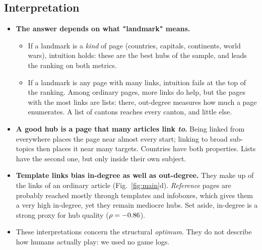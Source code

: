 \documentclass[10pt,a4paper]{article}
\begin{document}
\subsection{Interpretation}
\begin{itemize}
\item \textbf{The answer depends on what "landmark" means.}
  \begin{itemize}
  \item If a landmark is a \emph{kind} of page (countries, capitals, continents, world wars),
    intuition holds: these are the best hubs of the sample, and \BestHub{} leads the ranking on
    both metrics.
  \item If a landmark is any page with many links, intuition fails at the top of the ranking.
    Among ordinary pages, more links do help, but the pages with the most links are lists: there,
    out-degree measures how much a page enumerates. A list of cantons reaches every canton, and
    little else.
  \end{itemize}
\item \textbf{A good hub is a page that many articles link \emph{to}.} Being linked from
  everywhere places the page near almost every start; linking to broad sub-topics then places it
  near many targets. Countries have both properties. Lists have the second one, but only inside
  their own subject.
\item \textbf{Template links bias in-degree as well as out-degree.} They make up
  \BiasRandomMedShare{} of the links of an ordinary article (Fig.~\ref{fig:main}d).
  \emph{Reference} pages are probably reached mostly through templates and infoboxes, which gives
  them a very high in-degree, yet they remain mediocre hubs. Set aside, in-degree is a strong
  proxy for hub quality ($\rho=-0.86$).
\item These interpretations concern the structural \emph{optimum}. They do not describe how humans
  actually play: we used no game logs.
\end{itemize}
\end{document}
